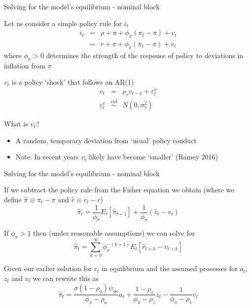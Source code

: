 

\begin{frame}{Solving for the model's equilibrium - nominal block}

Let us consider a simple policy rule for $i_{t}$
\begin{eqnarray*}
i_{t} 	&=& \rho + \pi + \phi_{\pi} (\pi_{t}-\pi) + v_{t} \\
		&=& r + \pi + \phi_{\pi} (\pi_{t}-\pi) + v_{t}
\end{eqnarray*}
where $\phi_{\pi}>0$ determines the strength of the response of policy to deviations in inflation from $\pi$

\vspace{2mm}
$v_{t}$ is a policy `shock' that follows an AR(1)
\begin{eqnarray*}
v_{t} 				&=& 					\rho_{v} v_{t-1} + \varepsilon_{t}^{v} \\
\varepsilon_{t}^{v}	&\stackrel{iid}{\sim}&	 N\left(0,\sigma_{v}^{2}\right)
\end{eqnarray*}

\vspace{1mm}
What is $v_{t}$?
\begin{itemize}
\item	A random, temporary deviation from `usual' policy conduct
\item	Note: In recent years $v_{t}$ likely have become `smaller' (Ramey 2016)
\end{itemize}

\end{frame}



\begin{frame}{Solving for the model's equilibrium - nominal block}

If we subtract the policy rule from the Fisher equation we obtain (where we define $\hat{\pi} \equiv \pi_{t}-\pi$ and $\hat{r} \equiv r_{t}-r$)
\[
\hat{\pi}_{t} = \frac{1}{\phi_{\pi}} E_{t}[\hat{\pi}_{t+1}] + \frac{1}{\phi_{\pi}}\left(\hat{r}_{t} - v_{t}\right)
\]

If $\phi_{\pi}>1$ then (under reasonable assumptions) we can solve for
\[
\hat{\pi}_{t} = \sum\limits_{k=0}^{\infty} \phi_{\pi}^{-(k+1)}E_{t}\left[ \hat{r}_{t+k} - v_{t+k} \right]
\]

Given our earlier solution for $r_{t}$ in equilibrium and the assumed processes for $a_{t}$, $z_{t}$ and $v_{t}$ we can rewrite this as
\[
\hat{\pi}_{t} = \frac{\sigma(1-\rho_{a})\psi_{ya}}{\phi_{\pi} - \rho_{a}} a_{t} + \frac{1-\rho_{z}}{\phi_{\pi} - \rho_{z}} z_{t} - \frac{1}{\phi_{\pi}-\rho_{v}} v_{t}
\]

\end{frame}

